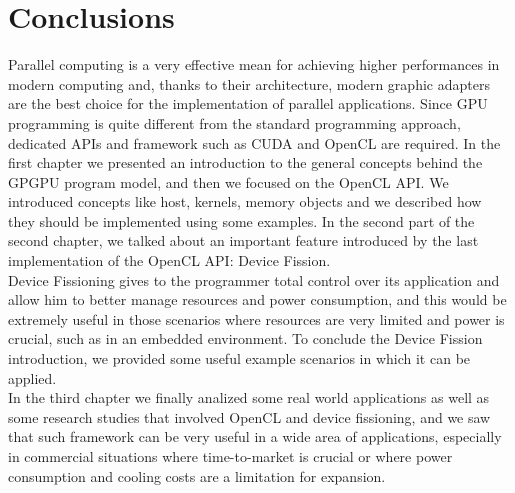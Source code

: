 \section{Conclusions}

Parallel computing is a very effective mean for achieving higher performances in modern computing and, thanks to their architecture, modern graphic adapters are the best choice for the implementation of parallel applications. Since GPU programming is quite different from the standard programming approach, dedicated APIs and framework such as CUDA and OpenCL are required. In the first chapter we presented an introduction to the general concepts behind the GPGPU program model, and then we focused on the OpenCL API. We introduced concepts like host, kernels, memory objects and we described how they should be implemented using some examples. In the second part of the second chapter, we talked about an important feature introduced by the last implementation of the OpenCL API: Device Fission.\\ Device Fissioning gives to the programmer total control over its application and allow him to better manage resources and power consumption, and this would be extremely useful in those scenarios where resources are very limited and power is crucial, such as in an embedded environment. To conclude the Device Fission introduction, we provided some useful example scenarios in which it can be applied.\\
In the third chapter we finally analized some real world applications as well as some research studies that involved OpenCL and device fissioning, and we saw that such framework can be very useful in a wide area of applications, especially in commercial situations where time-to-market is crucial or where power consumption and cooling costs are a limitation for expansion. 